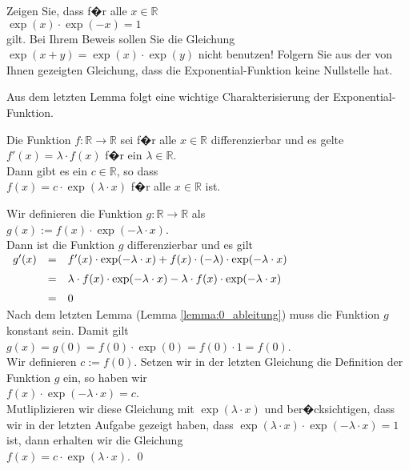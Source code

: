 \exercise
Zeigen Sie, dass f�r alle $x\in \mathbb{R}$
\\[0.2cm]
\hspace*{1.3cm}
$\exp(x) \cdot \exp(-x) = 1$ 
\\[0.2cm]
gilt.  Bei Ihrem Beweis sollen Sie die Gleichung $\exp(x+y) = \exp(x) \cdot \exp(y)$ nicht benutzen!
Folgern Sie aus der von Ihnen gezeigten Gleichung, dass die Exponential-Funktion keine Nullstelle hat. \eox
\vspace*{0.3cm}

\noindent
Aus dem letzten Lemma folgt eine wichtige Charakterisierung der Exponential-Funktion.
\begin{Lemma}
Die Funktion $f:\mathbb{R} \rightarrow \mathbb{R}$ sei f�r alle $x \in \mathbb{R}$ differenzierbar und es
gelte
\\[0.2cm]
\hspace*{1.3cm}
$f'(x) = \lambda \cdot f(x)$ \quad f�r ein $\lambda \in \mathbb{R}$.
\\[0.2cm]
Dann gibt es ein $c \in \mathbb{R}$, so dass
\\[0.2cm]
\hspace*{1.3cm}
$f(x) = c \cdot \exp(\lambda \cdot x)$ \quad f�r alle $x \in \mathbb{R}$ ist.
\end{Lemma}

\proof
Wir definieren die Funktion $g: \mathbb{R} \rightarrow \mathbb{R}$ als
\\[0.2cm]
\hspace*{1.3cm}
$g(x) := f(x) \cdot \exp(-\lambda \cdot x)$.
\\[0.2cm]
Dann ist die Funktion $g$ differenzierbar und es gilt
\\[0.2cm]
\hspace*{1.3cm}
$
\begin{array}[t]{lcll}
g'(x) & = & f'(x) \cdot \exp(-\lambda \cdot x) + f(x) \cdot (-\lambda) \cdot \exp(-\lambda \cdot x) 
          \\[0.2cm]
      & = & \lambda \cdot f(x) \cdot \exp(-\lambda \cdot x) - \lambda \cdot f(x) \cdot \exp(-\lambda \cdot x) 
          \\[0.2cm]
      & = & 0
\end{array}
$
\\[0.2cm]
Nach dem letzten Lemma (Lemma \ref{lemma:0_ableitung}) muss die Funktion $g$ konstant sein.  Damit gilt
\\[0.2cm]
\hspace*{1.3cm}
$g(x) = g(0) = f(0) \cdot \exp(0) = f(0) \cdot 1 = f(0)$.
\\[0.2cm]
Wir definieren $c:=f(0)$.  Setzen wir in der letzten Gleichung die Definition der Funktion $g$ ein, so
haben wir
\\[0.2cm]
\hspace*{1.3cm}
$f(x) \cdot \exp(-\lambda \cdot x) = c$.
\\[0.2cm]
Mutliplizieren wir diese Gleichung mit $\exp(\lambda \cdot x)$ und ber�cksichtigen, dass wir in der
letzten Aufgabe gezeigt haben, dass $\exp(\lambda \cdot x) \cdot \exp(-\lambda \cdot x) = 1$ ist,
dann erhalten wir die Gleichung
\\[0.2cm]
\hspace*{1.3cm}
$f(x) = c \cdot \exp(\lambda \cdot x)$.  \qed

